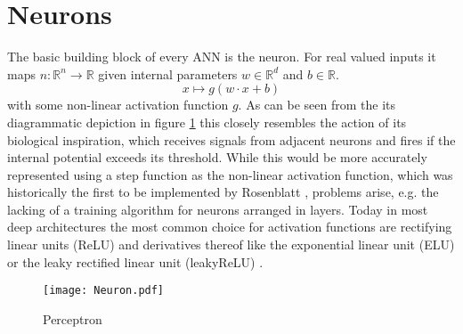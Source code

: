 \section{Neurons}
\label{sec:Neurons}
The basic building block of every ANN is the neuron. For real valued inputs it maps $n: \mathbb{R}^n \rightarrow \mathbb{R}$ given internal parameters $w \in \mathbb{R}^d$ and $b \in \mathbb{R}$.
\begin{equation}
x \mapsto g(w \cdot x + b)
\end{equation}
with some non-linear activation function $g$. As can be seen from the its diagrammatic depiction in figure \ref{fig:Neuron} this closely resembles the action of its biological inspiration, which receives signals from adjacent neurons and fires if the internal potential exceeds its threshold. While this would be more accurately represented using a step function as the non-linear activation function, which was historically the first to be implemented by Rosenblatt \cite{Perceptron}, problems arise, e.g. the lacking of a training algorithm for neurons arranged in layers. Today in most deep architectures the most common choice for activation functions are rectifying linear units (ReLU) and derivatives thereof like the exponential linear unit (ELU) \cite{Clevert2015} or the leaky rectified linear unit (leakyReLU) \cite{Maas2013}.
\begin{figure}
\centering
  \texttt{[image: Neuron.pdf]}
  \caption{Perceptron}
  \label{fig:Neuron}
\end{figure}

